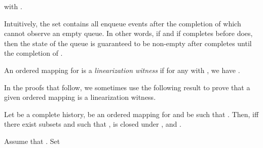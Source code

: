 \documentclass{LMCS}
\newcommand{\COMMENT}[1]{}
\newcommand\mylabel[1]{\label{#1}}
\begin{document}
with
.

Intuitively, the set  contains all enqueue events after the completion of which  cannot observe an empty queue.
In other words, if  and if  completes before  does, then the state of the queue is guaranteed to be non-empty after  completes until the completion of . 

\COMMENT{
 such that either there does not exist a  such that  or  exists and one of the following holds:
\begin{enumerate}
\item .
\item there exists  such that either  or .
\end{enumerate}
An equivalent definition given inductively is as follows:
}




\begin{defi}\mylabel{def:lin-witness}
An ordered mapping  for  is a {\em linearization witness} if for any  with , we have .
\end{defi}

In the proofs that follow, we sometimes use the following result to prove that a given ordered mapping is a linearization witness.
\begin{lem}\mylabel{lem:alt-lin-witness}
Let  be a complete history,  be an ordered mapping for  and  be such that .
Then,  iff there exist subsets  and  such that ,  is closed under , and .
\end{lem}

\proof\hfill

\noindent {\bf ()}
Assume that . Set
\end{document}
